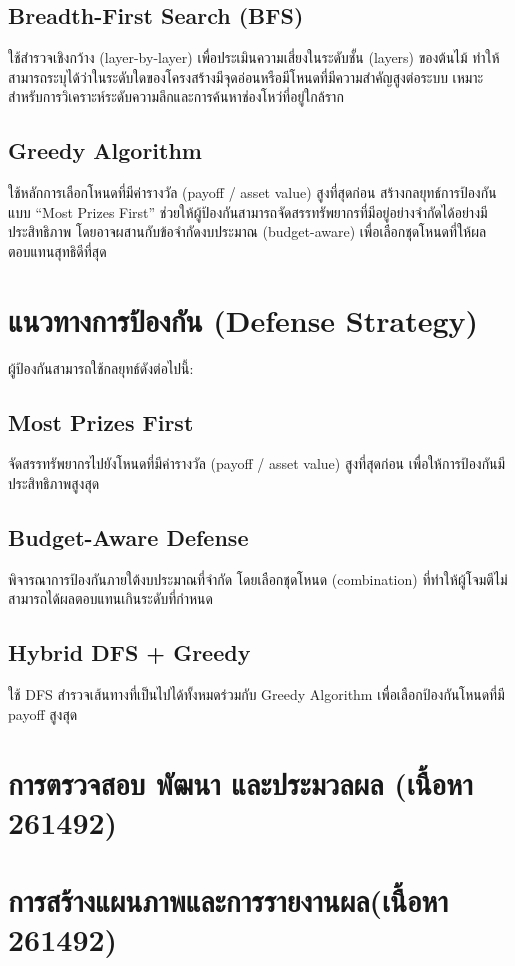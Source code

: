 \subsection{Breadth-First Search (BFS)}
ใช้สำรวจเชิงกว้าง (layer-by-layer) เพื่อประเมินความเสี่ยงในระดับชั้น (layers) ของต้นไม้ ทำให้สามารถระบุได้ว่าในระดับใดของโครงสร้างมีจุดอ่อนหรือมีโหนดที่มีความสำคัญสูงต่อระบบ เหมาะสำหรับการวิเคราะห์ระดับความลึกและการค้นหาช่องโหว่ที่อยู่ใกล้ราก

\subsection{Greedy Algorithm}
ใช้หลักการเลือกโหนดที่มีค่ารางวัล (payoff / asset value) สูงที่สุดก่อน สร้างกลยุทธ์การป้องกันแบบ ``Most Prizes First'' ช่วยให้ผู้ป้องกันสามารถจัดสรรทรัพยากรที่มีอยู่อย่างจำกัดได้อย่างมีประสิทธิภาพ โดยอาจผสานกับข้อจำกัดงบประมาณ (budget-aware) เพื่อเลือกชุดโหนดที่ให้ผลตอบแทนสุทธิดีที่สุด

\section{แนวทางการป้องกัน (Defense Strategy)}

ผู้ป้องกันสามารถใช้กลยุทธ์ดังต่อไปนี้:

\subsection{Most Prizes First}
จัดสรรทรัพยากรไปยังโหนดที่มีค่ารางวัล (payoff / asset value) สูงที่สุดก่อน เพื่อให้การป้องกันมีประสิทธิภาพสูงสุด

\subsection{Budget-Aware Defense}
พิจารณาการป้องกันภายใต้งบประมาณที่จำกัด โดยเลือกชุดโหนด (combination) ที่ทำให้ผู้โจมตีไม่สามารถได้ผลตอบแทนเกินระดับที่กำหนด

\subsection{Hybrid DFS + Greedy}
ใช้ DFS สำรวจเส้นทางที่เป็นไปได้ทั้งหมดร่วมกับ Greedy Algorithm เพื่อเลือกป้องกันโหนดที่มี payoff สูงสุด

\section{การตรวจสอบ พัฒนา และประมวลผล (เนื้อหา 261492)}


\section{การสร้างแผนภาพและการรายงานผล(เนื้อหา 261492)}

